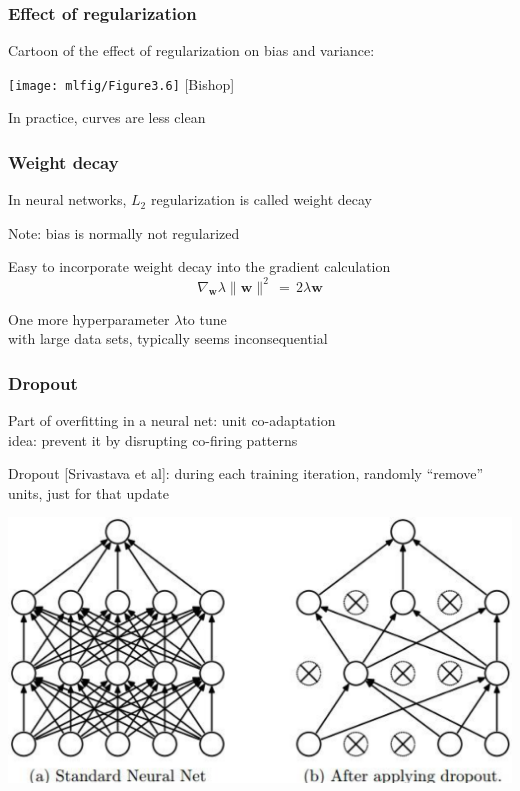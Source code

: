 \documentclass[xcolor=dvipsnames]{beamer}
\begin{document}
\begin{frame}
  \frametitle{Effect of regularization}
  
\bi
\item Cartoon of the effect of regularization on bias and variance:

\hspace{-1em}\texttt{[image: mlfig/Figure3.6]} [Bishop]
\item In practice, curves are less clean
\ei

\end{frame}

\begin{frame}
  \frametitle{Weight decay}
  \bi
\item In neural networks, $L_2$ regularization is called weight decay
\item Note: bias is normally not regularized
\item Easy to incorporate weight decay into the gradient calculation
\[\nabla_{\mathbf{w}}\lambda\|\mathbf{w}\|^2\,=\,2\lambda\mathbf{w}
\]
\item One more hyperparameter $\lambda $to tune\\
with large data sets, typically seems inconsequential
\ei
\end{frame}

\begin{frame}
  \frametitle{Dropout}
  \bi
\item Part of overfitting in a neural net: unit co-adaptation\\
idea: prevent it by disrupting co-firing patterns
\item Dropout [Srivastava et al]: during each training iteration,
  randomly ``remove''  units, just for that update 

\includegraphics[width=.7\textwidth]{dropout-ill}
\ei

\end{frame}
\end{document}
